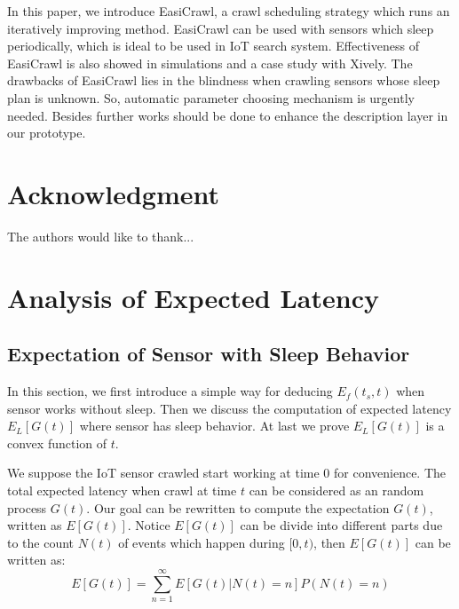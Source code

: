 \documentclass[conference]{IEEEtran}
\begin{document}
In this paper, we introduce EasiCrawl, a crawl scheduling strategy which runs an iteratively improving method. 
EasiCrawl can be used with sensors which sleep periodically, which is ideal to be used in IoT search system. 
Effectiveness of EasiCrawl is also showed in simulations and a case study with Xively. 
The drawbacks of EasiCrawl lies in the blindness when crawling sensors whose sleep plan is unknown. 
So, automatic parameter choosing mechanism is urgently needed.
Besides further works should be done to enhance the description layer in our prototype.

\section*{Acknowledgment}


The authors would like to thank...


\ifCLASSOPTIONcaptionsoff
  \newpage
\fi





\appendices
\section{Analysis of Expected Latency}

\subsection{Expectation of Sensor with Sleep Behavior}

In this section, we first introduce a simple way for deducing $E_f(t_s, t)$ when sensor works without sleep.
Then we discuss the computation of expected latency $E_L[G(t)]$ where sensor has sleep behavior.
At last we prove $E_L[G(t)]$ is a convex function of $t$.

We suppose the IoT sensor crawled start working at time $0$ for convenience. 
The total expected latency when crawl at time $t$ can be considered as an random process $G(t)$. Our goal can be rewritten to compute the expectation $G(t)$, written as $E[G(t)]$. 
Notice $E[G(t)]$ can be divide into different parts due to the count $N(t)$ of events which happen during $[0, t)$, then $E[G(t)]$ can be written as:
\begin{equation}
E[G(t)] = \sum_{n=1}^{\infty} E[G(t)|N(t)=n]P(N(t)=n) \label{EG}
\end{equation}
\end{document}

